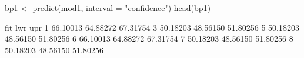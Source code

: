 \begin{Schunk}
\begin{Sinput}
 bp1 <- predict(mod1, interval = "confidence")
 head(bp1)
\end{Sinput}
\begin{Soutput}
       fit      lwr      upr
1 66.10013 64.88272 67.31754
3 50.18203 48.56150 51.80256
5 50.18203 48.56150 51.80256
6 66.10013 64.88272 67.31754
7 50.18203 48.56150 51.80256
8 50.18203 48.56150 51.80256
\end{Soutput}
\end{Schunk}
